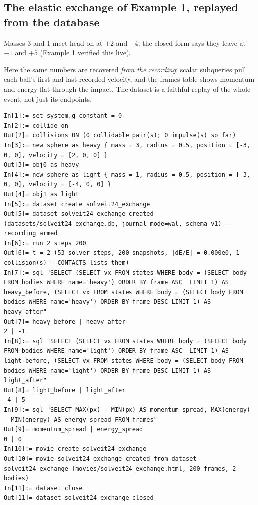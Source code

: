 \documentclass[11pt]{article}
\begin{document}
\subsection{The elastic exchange of Example 1, replayed from the database}

Masses 3 and 1 meet head-on at $+2$ and $-4$; the closed form says
they leave at $-1$ and $+5$ (Example 1 verified this live).

Here the same numbers are recovered \emph{from the recording}: scalar
subqueries pull each ball's first and last recorded velocity, and the
frames table shows momentum and energy flat through the impact. The
dataset is a faithful replay of the whole event, not just its
endpoints.

\begin{lstlisting}
In[1]:= set system.g_constant = 0
In[2]:= collide on
Out[2]= collisions ON (0 collidable pair(s); 0 impulse(s) so far)
In[3]:= new sphere as heavy { mass = 3, radius = 0.5, position = [-3, 0, 0], velocity = [2, 0, 0] }
Out[3]= obj0 as heavy
In[4]:= new sphere as light { mass = 1, radius = 0.5, position = [ 3, 0, 0], velocity = [-4, 0, 0] }
Out[4]= obj1 as light
In[5]:= dataset create solveit24_exchange
Out[5]= dataset solveit24_exchange created (datasets/solveit24_exchange.db, journal_mode=wal, schema v1) — recording armed
In[6]:= run 2 steps 200
Out[6]= t = 2 (53 solver steps, 200 snapshots, |dE/E| = 0.000e0, 1 collision(s) — CONTACTS lists them)
In[7]:= sql "SELECT (SELECT vx FROM states WHERE body = (SELECT body FROM bodies WHERE name='heavy') ORDER BY frame ASC  LIMIT 1) AS heavy_before, (SELECT vx FROM states WHERE body = (SELECT body FROM bodies WHERE name='heavy') ORDER BY frame DESC LIMIT 1) AS heavy_after"
Out[7]= heavy_before | heavy_after
2 | -1
In[8]:= sql "SELECT (SELECT vx FROM states WHERE body = (SELECT body FROM bodies WHERE name='light') ORDER BY frame ASC  LIMIT 1) AS light_before, (SELECT vx FROM states WHERE body = (SELECT body FROM bodies WHERE name='light') ORDER BY frame DESC LIMIT 1) AS light_after"
Out[8]= light_before | light_after
-4 | 5
In[9]:= sql "SELECT MAX(px) - MIN(px) AS momentum_spread, MAX(energy) - MIN(energy) AS energy_spread FROM frames"
Out[9]= momentum_spread | energy_spread
0 | 0
In[10]:= movie create solveit24_exchange
Out[10]= movie solveit24_exchange created from dataset solveit24_exchange (movies/solveit24_exchange.html, 200 frames, 2 bodies)
In[11]:= dataset close
Out[11]= dataset solveit24_exchange closed
\end{lstlisting}
\end{document}
